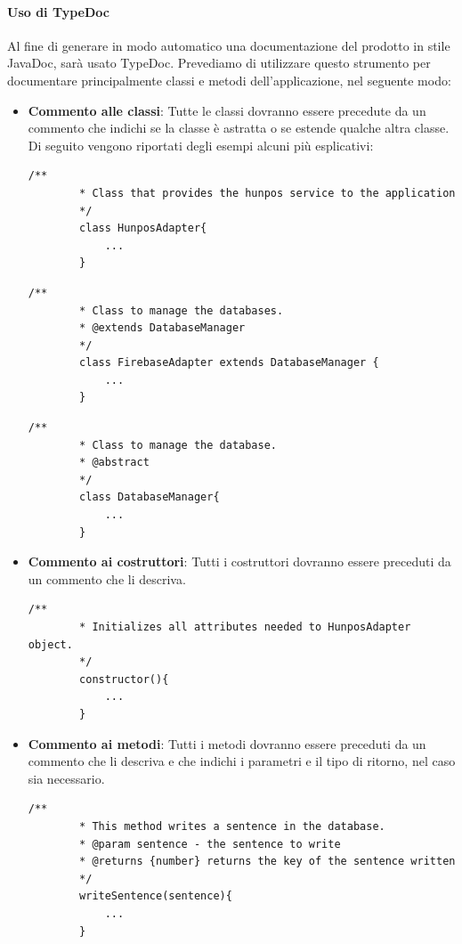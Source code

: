 \documentclass[11pt,a4paper]{article}
\begin{document}
{	\paragraph{Uso di TypeDoc}
	Al fine di generare in modo automatico una documentazione del prodotto in stile JavaDoc, sarà usato TypeDoc.
	Prevediamo di utilizzare questo strumento per documentare principalmente classi e metodi dell'applicazione, nel seguente modo:
	\begin{itemize}
		\item \textbf{Commento alle classi}: Tutte le classi dovranno essere precedute da un commento che indichi se la classe è astratta o se estende qualche altra classe. Di seguito vengono riportati degli esempi alcuni più esplicativi:
		\begin{lstlisting}[caption=Commento ad una classe semplice]
		/**
		* Class that provides the hunpos service to the application
		*/
		class HunposAdapter{
			...
		}
		\end{lstlisting}
			\begin{lstlisting}[caption=Commento ad una classe che ne estende un altra]
		/**
		* Class to manage the databases.
		* @extends DatabaseManager
		*/
		class FirebaseAdapter extends DatabaseManager {
			...
		}
		\end{lstlisting}
		\begin{lstlisting}[caption=Commento ad una classe astratta]
		/**
		* Class to manage the database.
		* @abstract
		*/
		class DatabaseManager{
			...
		}
		\end{lstlisting}
		\item \textbf{Commento ai costruttori}:
		Tutti i costruttori dovranno essere preceduti da un commento che li descriva. 
		\begin{lstlisting}[caption=Commento ad una classe astratta]
		/**
		* Initializes all attributes needed to HunposAdapter object.
		*/
		constructor(){
			...
		}
		\end{lstlisting}
		\item \textbf{Commento ai metodi}:
		Tutti i metodi dovranno essere preceduti da un commento che li descriva e che indichi i parametri e il tipo di ritorno, nel caso sia necessario.
		\begin{lstlisting}[caption=Commento ad un metodo]
		/**
		* This method writes a sentence in the database.
		* @param sentence - the sentence to write
		* @returns {number} returns the key of the sentence written
		*/
		writeSentence(sentence){
			...
		}
		
		\end{lstlisting}
	\end{itemize}
	
}
\end{document}
